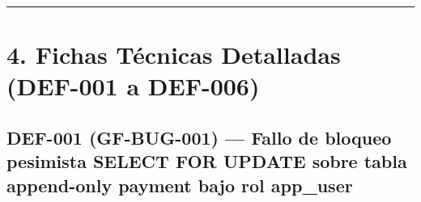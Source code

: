\documentclass[10pt,a4paper]{article}
\begin{document}
\endgroup\medskip

\begin{center}\rule{0.5\linewidth}{0.5pt}\end{center}


\section{4. Fichas Técnicas Detalladas (DEF-001 a DEF-006)}\label{4-fichas-tuxe9cnicas-detalladas-def-001-a-def-006}


\subsection{DEF-001 (GF-BUG-001) --- Fallo de bloqueo pesimista SELECT FOR UPDATE sobre tabla append-only payment bajo rol app\_user}\label{def-001-gf-bug-001--fallo-de-bloqueo-pesimista-select-for-update-sobre-tabla-append-only-payment-bajo-rol-app_user}

\begingroup\singlespacing\footnotesize\setlength{\parskip}{0pt}
\end{document}
